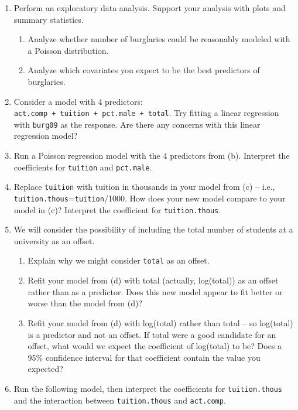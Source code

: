 \documentclass[
]{krantz}
\providecommand{\tightlist}{%
  \setlength{\itemsep}{0pt}\setlength{\parskip}{0pt}}
\begin{document}
\begin{enumerate}
  \begin{enumerate}
  \def\labelenumii{\alph{enumii}.}
  \tightlist
  \item
    Perform an exploratory data analysis. Support your analysis with plots and summary statistics.

    \begin{enumerate}
    \def\labelenumiii{\roman{enumiii}.}
    \tightlist
    \item
      Analyze whether number of burglaries could be reasonably modeled with a Poisson distribution.
    \item
      Analyze which covariates you expect to be the best predictors of burglaries.
    \end{enumerate}
  \item
    Consider a model with 4 predictors: \texttt{act.comp\ +\ tuition\ +\ pct.male\ +\ total}. Try fitting a linear regression with \texttt{burg09} as the response. Are there any concerns with this linear regression model?
  \item
    Run a Poisson regression model with the 4 predictors from (b). Interpret the coefficients for \texttt{tuition} and \texttt{pct.male}.
  \item
    Replace \texttt{tuition} with tuition in thousands in your model from (c) -- i.e., \texttt{tuition.thous}=\texttt{tuition}/1000. How does your new model compare to your model in (c)? Interpret the coefficient for \texttt{tuition.thous}.
  \item
    We will consider the possibility of including the total number of students at a university as an offset.

    \begin{enumerate}
    \def\labelenumiii{\roman{enumiii}.}
    \tightlist
    \item
      Explain why we might consider \texttt{total} as an offset.
    \item
      Refit your model from (d) with total (actually, log(total)) as an offset rather than as a predictor. Does this new model appear to fit better or worse than the model from (d)?
    \item
      Refit your model from (d) with log(total) rather than total -- so log(total) is a predictor and not an offset. If total were a good candidate for an offset, what would we expect the coefficient of log(total) to be? Does a 95\% confidence interval for that coefficient contain the value you expected?
    \end{enumerate}
  \item
    Run the following model, then interpret the coefficients for \texttt{tuition.thous} and the interaction between \texttt{tuition.thous} and \texttt{act.comp}.
  \end{enumerate}
\end{enumerate}
\end{document}
